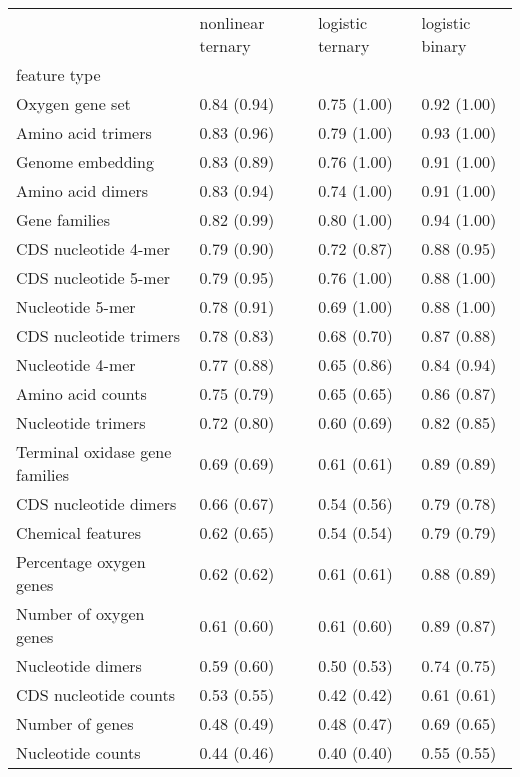\begin{tabular}{llll}
\toprule
 & nonlinear ternary & logistic ternary & logistic binary \\
feature type &  &  &  \\
\midrule
Oxygen gene set & 0.84 (0.94) & 0.75 (1.00) & 0.92 (1.00) \\
Amino acid trimers & 0.83 (0.96) & 0.79 (1.00) & 0.93 (1.00) \\
Genome embedding & 0.83 (0.89) & 0.76 (1.00) & 0.91 (1.00) \\
Amino acid dimers & 0.83 (0.94) & 0.74 (1.00) & 0.91 (1.00) \\
Gene families & 0.82 (0.99) & 0.80 (1.00) & 0.94 (1.00) \\
CDS nucleotide 4-mer & 0.79 (0.90) & 0.72 (0.87) & 0.88 (0.95) \\
CDS nucleotide 5-mer & 0.79 (0.95) & 0.76 (1.00) & 0.88 (1.00) \\
Nucleotide 5-mer & 0.78 (0.91) & 0.69 (1.00) & 0.88 (1.00) \\
CDS nucleotide trimers & 0.78 (0.83) & 0.68 (0.70) & 0.87 (0.88) \\
Nucleotide 4-mer & 0.77 (0.88) & 0.65 (0.86) & 0.84 (0.94) \\
Amino acid counts & 0.75 (0.79) & 0.65 (0.65) & 0.86 (0.87) \\
Nucleotide trimers & 0.72 (0.80) & 0.60 (0.69) & 0.82 (0.85) \\
Terminal oxidase gene families & 0.69 (0.69) & 0.61 (0.61) & 0.89 (0.89) \\
CDS nucleotide dimers & 0.66 (0.67) & 0.54 (0.56) & 0.79 (0.78) \\
Chemical features & 0.62 (0.65) & 0.54 (0.54) & 0.79 (0.79) \\
Percentage oxygen genes & 0.62 (0.62) & 0.61 (0.61) & 0.88 (0.89) \\
Number of oxygen genes & 0.61 (0.60) & 0.61 (0.60) & 0.89 (0.87) \\
Nucleotide dimers & 0.59 (0.60) & 0.50 (0.53) & 0.74 (0.75) \\
CDS nucleotide counts & 0.53 (0.55) & 0.42 (0.42) & 0.61 (0.61) \\
Number of genes & 0.48 (0.49) & 0.48 (0.47) & 0.69 (0.65) \\
Nucleotide counts & 0.44 (0.46) & 0.40 (0.40) & 0.55 (0.55) \\
\bottomrule
\end{tabular}
